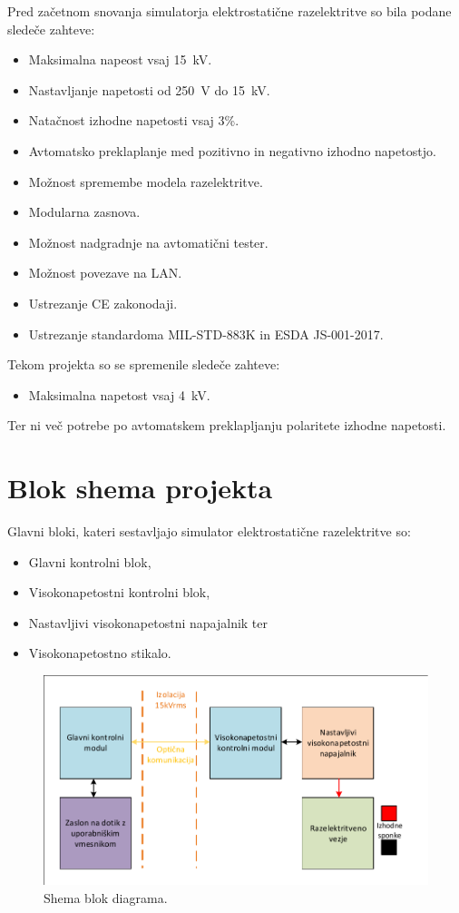 \documentclass[a4paper,twoside,openright,12pt,slovene]{book}
\begin{document}
Pred začetnom snovanja simulatorja elektrostatične razelektritve so bila podane sledeče zahteve:
\begin{itemize}
\item Maksimalna napeost vsaj \SI{15}{\kilo\volt}.
\item Nastavljanje napetosti od \SI{250}{\volt} do \SI{15}{\kilo\volt}.
\item Natačnost izhodne napetosti vsaj 3\%.
\item Avtomatsko preklaplanje med pozitivno in negativno izhodno napetostjo.
\item Možnost spremembe modela razelektritve.
\item Modularna zasnova.
\item Možnost nadgradnje na avtomatični tester.
\item Možnost povezave na LAN.
\item Ustrezanje CE zakonodaji.
\item Ustrezanje standardoma MIL-STD-883K in ESDA JS-001-2017.
\end{itemize}

Tekom projekta so se spremenile sledeče zahteve:
\begin{itemize}
\item Maksimalna napetost vsaj \SI{4}{\kilo\volt}.
\end{itemize}
Ter ni več potrebe po avtomatskem preklapljanju polaritete izhodne napetosti.

\chapter{Blok shema projekta} \label{blokshemaprojekta}

Glavni bloki, kateri sestavljajo simulator elektrostatične razelektritve so:
\begin{itemize}
\item Glavni kontrolni blok,
\item Visokonapetostni kontrolni blok,
\item Nastavljivi visokonapetostni napajalnik ter
\item Visokonapetostno stikalo.
\end{itemize}

\begin{figure}[h]
    \centering
    \includegraphics[width=1\columnwidth]{Sheme/Osnovna blok shema poenostavljena.pdf}
    \caption{\label{BlokDiagramShema} Shema blok diagrama.}
\end{figure}
\end{document}
